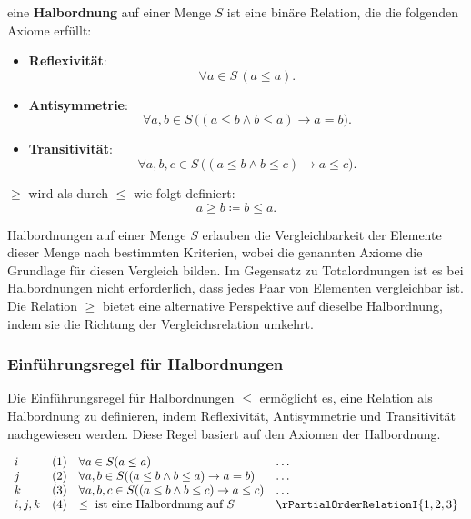 \documentclass[main.tex]{subfiles}
\begin{document}
\begin{definition}[Halbordnung]
    eine \textbf{Halbordnung} auf einer Menge \( S \) ist eine binäre Relation, die die folgenden Axiome erfüllt:

    \begin{itemize}
        \item \textbf{Reflexivität}:
        \[
        \forall a \in S \, (a \leq a).
        \]
        
        \item \textbf{Antisymmetrie}: 
        \[
        \forall a, b \in S \, \big( (a \leq b \land b \leq a) \rightarrow a = b \big).
        \]
        
        \item \textbf{Transitivität}: 
        \[
        \forall a, b, c \in S \, \big( (a \leq b \land b \leq c) \rightarrow a \leq c \big).
        \]
    \end{itemize}

    \(\geq\) wird als durch \(\leq\) wie folgt definiert:
    \[
    a \geq b \coloneqq b \leq a.
    \]
\end{definition}

\begin{remark}
    Halbordnungen auf einer Menge \( S \) erlauben die Vergleichbarkeit der Elemente dieser Menge nach bestimmten Kriterien, wobei die genannten Axiome die Grundlage für diesen Vergleich bilden. Im Gegensatz zu Totalordnungen ist es bei Halbordnungen nicht erforderlich, dass jedes Paar von Elementen vergleichbar ist. Die Relation \(\geq\) bietet eine alternative Perspektive auf dieselbe Halbordnung, indem sie die Richtung der Vergleichsrelation umkehrt.
\end{remark}

\subsubsection*{Einführungsregel für Halbordnungen}
\label{rule:rPartialOrderRelationI}
Die Einführungsregel für Halbordnungen \(\leq\) ermöglicht es, eine Relation als Halbordnung zu definieren, indem Reflexivität, Antisymmetrie und Transitivität nachgewiesen werden. Diese Regel basiert auf den Axiomen der Halbordnung.

\[
\begin{array}{llll}
    i       & (1) & \forall a \in S (a \leq a) & \dots \\
    j       & (2) & \forall a, b \in S ((a \leq b \land b \leq a) \rightarrow a = b) & \dots \\
    k       & (3) & \forall a, b, c \in S ((a \leq b \land b \leq c) \rightarrow a \leq c) & \dots \\
    i,j,k   & (4) & \leq \text{ ist eine Halbordnung auf } S & \rPartialOrderRelationI{1,2,3}
\end{array}
\]
\end{document}
